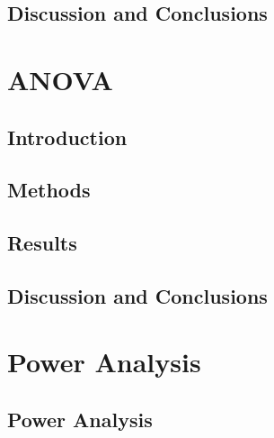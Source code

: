 \documentclass[svgnames,smaller]{beamer}
\begin{document}
			

		

		

	\subsection{Discussion and Conclusions}
				
			
\section{ANOVA}
	
	\subsection{Introduction}

	\subsection{Methods}
		

	\subsection{Results}
		
		
		
		
	\subsection{Discussion and Conclusions}
		

\section{Power Analysis}
	
	\subsection{Power Analysis}
		
\end{document}
